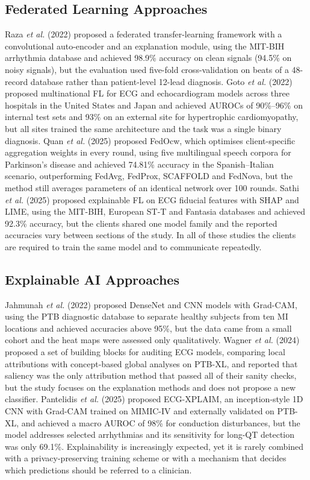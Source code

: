 \subsection{Federated Learning Approaches}
Raza \textit{et al.} (2022) \cite{raza2022fed} proposed a federated transfer-learning framework with
a convolutional auto-encoder and an explanation module, using the MIT-BIH arrhythmia database and
achieved 98.9\% accuracy on clean signals (94.5\% on noisy signals), but the evaluation used
five-fold cross-validation on beats of a 48-record database rather than patient-level 12-lead
diagnosis. Goto \textit{et al.} (2022) \cite{goto2022fed} proposed multinational FL for ECG and
echocardiogram models across three hospitals in the United States and Japan and achieved AUROCs of
90\%--96\% on internal test sets and 93\% on an external site for hypertrophic cardiomyopathy, but
all sites trained the same architecture and the task was a single binary diagnosis. Quan
\textit{et al.} (2025) \cite{quan2025fedocw} proposed FedOcw, which optimises client-specific
aggregation weights in every round, using five multilingual speech corpora for Parkinson's disease
and achieved 74.81\% accuracy in the Spanish--Italian scenario, outperforming FedAvg, FedProx,
SCAFFOLD and FedNova, but the method still averages parameters of an identical network over 100
rounds. Sathi \textit{et al.} (2025) \cite{sathi2025xfl} proposed explainable FL on ECG fiducial
features with SHAP and LIME, using the MIT-BIH, European ST-T and Fantasia databases and achieved
92.3\% accuracy, but the clients shared one model family and the reported accuracies vary between
sections of the study. In all of these studies the clients are required to train the same model and
to communicate repeatedly.

\subsection{Explainable AI Approaches}
Jahmunah \textit{et al.} (2022) \cite{jahmunah2022gradcam} proposed DenseNet and CNN models with
Grad-CAM, using the PTB diagnostic database to separate healthy subjects from ten MI locations and
achieved accuracies above 95\%, but the data came from a small cohort and the heat maps were assessed
only qualitatively. Wagner \textit{et al.} (2024) \cite{wagner2024xai} proposed a set of building
blocks for auditing ECG models, comparing local attributions with concept-based global analyses on
PTB-XL, and reported that saliency was the only attribution method that passed all of their sanity
checks, but the study focuses on the explanation methods and does not propose a new classifier.
Pantelidis \textit{et al.} (2025) \cite{pantelidis2025xplaim} proposed ECG-XPLAIM, an inception-style
1D CNN with Grad-CAM trained on MIMIC-IV and externally validated on PTB-XL, and achieved a macro
AUROC of 98\% for conduction disturbances, but the model addresses selected arrhythmias and its
sensitivity for long-QT detection was only 69.1\%. Explainability is increasingly expected, yet it
is rarely combined with a privacy-preserving training scheme or with a mechanism that decides which
predictions should be referred to a clinician.

